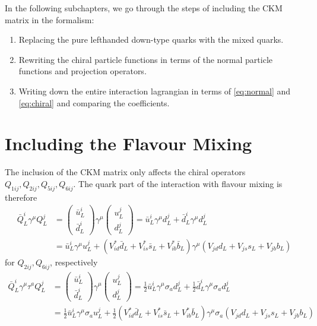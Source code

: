 \clearpage
In the following subchapters, we go through the steps of including the CKM matrix in the formalism:
\begin{enumerate}
	\item Replacing the pure lefthanded down-type quarks with the mixed quarks.
	\item Rewriting the chiral particle functions in terms of the normal particle functions and projection operators.
	\item Writing down the entire interaction lagrangian in terms of \eqref{eq:normal} and \eqref{eq:chiral} and comparing the coefficients.
\end{enumerate}

\section{Including the Flavour Mixing}
The inclusion of the CKM matrix only affects the chiral operators $Q_{1ij},Q_{2ij},Q_{5ij},Q_{6ij}$. The quark part of the interaction with flavour mixing is therefore
\begin{align*}
	\bar{Q}_L^i\gamma^\mu Q_L^j &= \begin{pmatrix}
	\bar{u}_L^i \\ \bar{d}_L^i
	\end{pmatrix}
	\gamma^\mu \begin{pmatrix}
	u_L^j \\ d_L^j
	\end{pmatrix}
	= \bar{u}_L^i\gamma^\mu d_L^j + \bar{d}_L^i\gamma^\mu d_L^j \\
	&= \bar{u}_L^i\gamma^\mu u_L^j + (V_{id}^*\bar{d}_L + V_{is}^*\bar{s}_L+V_{ib}^*\bar{b}_L)\gamma^\mu(V_{jd}d_L+V_{js}s_L+V_{jb}b_L)
\end{align*}
for $Q_{2ij}, Q_{6ij}$, respectively
\begin{align*}
	\bar{Q}_L^i\gamma^\mu\tau^a Q_L^j &=  \begin{pmatrix}
	\bar{u}_L^i \\ \bar{d}_L^i
	\end{pmatrix}
	\gamma^\mu \begin{pmatrix}
	u_L^j \\ d_L^j
	\end{pmatrix}
	= \frac{1}{2}\bar{u}_L^i\gamma^\mu \sigma_a d_L^j + \frac{1}{2}\bar{d}_L^i\gamma^\mu\sigma_a d_L^j \\
	&= \frac{1}{2}\bar{u}_L^i\gamma^\mu \sigma_a u_L^j + \frac{1}{2}(V_{id}^*\bar{d}_L + V_{is}^*\bar{s}_L+V_{ib}^*\bar{b}_L)\gamma^\mu\sigma_a(V_{jd}d_L+V_{js}s_L+V_{jb}b_L)
\end{align*}
